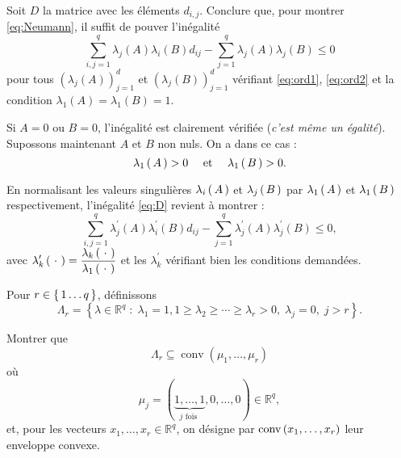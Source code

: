 \begin{qst}
 Soit $D$ la matrice avec les éléments $d_{i,j}$. Conclure que, pour montrer
 \eqref{eq:Neumann}, il suffit de pouver l'inégalité
 \begin{equation}\label{eq:D}
  \sum _ { i , j = 1 } ^ { q } \lambda _ { j } ( A ) \lambda _ { i } ( B )
  d _ { i j } - \sum _ { j = 1 } ^ { q } \lambda _ { j } ( A ) \lambda _ { j } ( B ) \leq 0
 \end{equation}
 pour tous $\left( \lambda _ { j } ( A ) \right) _ { j = 1 } ^ { d }$ et
 $\left( \lambda _ { j } ( B ) \right) _ { j = 1 } ^ { d }$ vérifiant
 \eqref{eq:ord1}, \eqref{eq:ord2} et la condition
 $ \displaystyle \lambda _ { 1 } ( A ) = \lambda _ { 1 } ( B ) = 1$.
\end{qst}

\begin{rep}

 Si $A = 0$ ou $B = 0$, l'inégalité est clairement vérifiée (\textit{c'est même un égalité}). Supossons maintenant $A$ et $B$ non nuls. On a dans ce cas :
 $$ \lambda_1\left( \, A \, \right) >0 \quad \text{ et } \quad \lambda_1\left( \, B \, \right)>0.$$

 En normalisant les valeurs singulières $\lambda_i\left( \, A \, \right)$ et $\lambda_j\left( \, B \, \right)$
 par $\lambda_1\left( \, A \, \right)$ et $\lambda_1\left( \, B \, \right)$ respectivement, l'inégalité \eqref{eq:D}
 revient à montrer :
 $$  \sum _ { i , j = 1 } ^ { q } \lambda _ { j }^{\prime} ( A ) \lambda _ { i }^{\prime} ( B )
  d _ { i j } - \sum _ { j = 1 } ^ { q } \lambda _ { j }^{\prime} ( A ) \lambda _ { j }^{\prime} ( B ) \leq 0,$$
 avec $\displaystyle \lambda _ { k }^{\prime}\left( \, \, \cdot \,  \, \right) =
  \frac{\lambda _ { k }\left( \, \, \cdot \,  \, \right)}{\lambda_1\left( \, \, \cdot \,  \, \right)}$ et les
 $\lambda _ { k }^{\prime}$ vérifiant bien les conditions demandées.
\end{rep}

\begin{qst}

 Pour $r \in \left \{ \, 1 \ldots q \, \right \}$, définissons
 $$\Lambda _ { r } = \left\{ \lambda \in \mathbb { R } ^ { q } \; : \;
  \lambda _ { 1 } = 1,1 \geq \lambda _ { 2 } \geq \cdots \geq \lambda _ { r } >
  0 , \; \lambda _ { j } = 0 , \;j > r \right\}.$$

 Montrer que $$\Lambda _ { r } \subseteq \operatorname { conv }
  \left( \mu _ { 1 } , \ldots , \mu _ { r } \right)$$
 où $$\mu _ { j } = ( \underbrace { 1 , \ldots , 1 } _ { j \text { fois }
  } , 0 , \ldots , 0 ) \in \mathbb { R } ^ { q },$$
 et, pour les vecteurs $x _ { 1 } , \dots , x _ { r } \in \mathbb { R } ^ { q }$,
 on désigne par $\operatorname{conv} \left( x _ { 1 } , \dots , x _ { r } \right)$ leur enveloppe
 convexe.
\end{qst}

